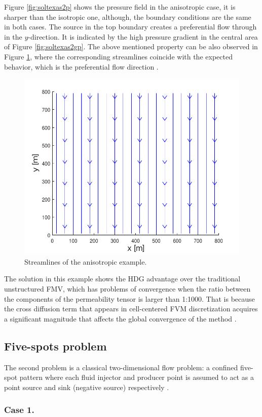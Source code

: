 \documentclass[review]{elsarticle}
\begin{document}
Figure \ref{fig:soltexas2p} shows the pressure field in the anisotropic case, it is sharper than the isotropic one, although, the boundary conditions are the same in both cases. The source in the top boundary creates a preferential flow through in the $y$-direction. It is indicated by the high pressure gradient in the central area of Figure \ref{fig:soltexas2gp}. The above mentioned property can be also observed in  Figure \ref{fig:soltexas2st}, where the corresponding streamlines coincide with the expected behavior, which is the preferential flow direction \cite{FERGUSON1996}. 
\begin{figure}[H]
	\centering
	\includegraphics[width=0.45\linewidth]{./Figures/Examples/Laplacian_Anisotorpy/soltexas2stream.pdf}
	\caption[Test geometry 1]{Streamlines of the anisotropic example.}
	\label{fig:soltexas2st}
\end{figure}

The solution in this example shows the HDG advantage over the traditional unstructured FMV, which has problems of convergence when the ratio between the components of the permeability tensor is larger than 1:1000. \cite{FERGUSON1996} That is because the cross diffusion term that appears in cell-centered FVM discretization \cite{jasak1996error}\cite{juretic2005error}   acquires a significant magnitude that affects the global convergence of the method \cite{jayantha2003}\cite{loudyi}.
  
\subsection{Five-spots problem}
The second problem is a classical two-dimensional flow problem: a confined five-spot pattern where each fluid injector and producer point is assumed to act as a point source and sink (negative source) respectively \cite{KATIYAR}.

\subsubsection{Case 1.}
\end{document}

